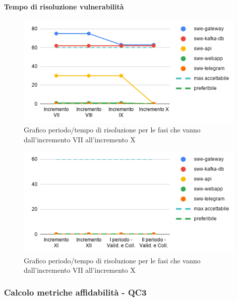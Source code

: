 \paragraph{Tempo di risoluzione vulnerabilità}
	\begin{figure}[H]
			\centering
			\includegraphics[width=0.8\linewidth]{./res/images/QM-PROD-5-TVUL.png}
			\caption{Grafico periodo/tempo di risoluzione per le fasi che vanno dall'incremento VII all'incremento X}
			\label{fig:Grafico periodo/tempo di risoluzione per le fasi che vanno dall'incremento VII all'incremento X}
	\end{figure}
	\begin{figure}[H]
			\centering
			\includegraphics[width=0.8\linewidth]{./res/images/QM-PROD-5-TVUL_1.png}
			\caption{Grafico periodo/tempo di risoluzione per le fasi che vanno dall'incremento VII all'incremento X}
			\label{fig:Grafico periodo/tempo di risoluzione per le fasi che vanno dall'incremento XI alla fase di validazione e collaudo}
	\end{figure}

\subsubsection{Calcolo metriche affidabilità - QC3}
